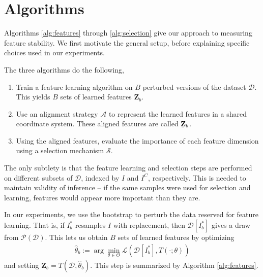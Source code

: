 
\section{Algorithms}
\label{sec:algorithms}

Algorithms \ref{alg:features} through \ref{alg:selection} give our approach to
measuring feature stability. We first motivate the general setup, before
explaining specific choices used in our experiments.

The three algorithms do the following,
\begin{enumerate}
  \item Train a feature learning algorithm on $B$ perturbed versions of the
    dataset $\mathcal{D}$. This yields $B$ sets of learned features
    $\mathbf{Z}_{b}$.
  \item Use an alignment strategy $\mathcal{A}$ to represent the learned
    features in a shared coordinate system. These aligned features are called
    $\underaccent{\bar}{\mathbf{Z}}_{b}$.
  \item Using the aligned features, evaluate the importance of each feature
    dimension using a selection mechanism $\mathcal{S}$.
\end{enumerate}

The only subtlety is that the feature learning and selection steps are performed
on different subsets of $\mathcal{D}$, indexed by $I$ and $I^{C}$, respectively.
This is needed to maintain validity of inference -- if the same samples were
used for selection and learning, features would appear more important than they
are.

In our experiments, we use the bootstrap to perturb the data reserved for
feature learning. That is, if $I_{b}^{\ast}$ resamples $I$ with replacement,
then $\mathcal{D}\left[I^{\ast}_{b}\right]$ gives a draw from
$\mathcal{P}\left(\mathcal{D}\right)$. This lets us obtain $B$ sets of learned
features by optimizing
\begin{align*}
  \hat{\theta}_{b} := \arg\min_{\theta \in \Theta} \mathcal{L}\left(\mathcal{D}\left[I_{b}^{\ast}\right], T\left(\cdot; \theta\right)\right)
\end{align*}
and setting $\mathbf{Z}_{b} = T\left(\mathcal{D}, \hat{\theta}_{b}\right)$. This
step is summarized by Algorithm \ref{alg:features}.

